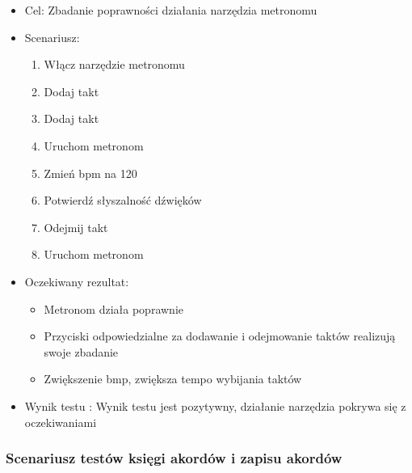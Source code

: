 \begin{itemize}
    \item Cel: Zbadanie poprawności działania narzędzia metronomu
    \item Scenariusz:
        \begin{enumerate}
            \item Włącz narzędzie metronomu
            \item Dodaj takt 
            \item Dodaj takt
            \item Uruchom metronom
            \item Zmień bpm na 120
            \item Potwierdź słyszalność dźwięków
            \item Odejmij takt
            \item Uruchom metronom
        \end{enumerate}
    \item Oczekiwany rezultat:
        \begin{itemize}
            \item Metronom działa poprawnie
            \item Przyciski odpowiedzialne za dodawanie i odejmowanie taktów realizują swoje zbadanie
            \item Zwiększenie bmp, zwiększa tempo wybijania taktów
        \end{itemize}
    \item Wynik testu : Wynik testu jest pozytywny, działanie narzędzia pokrywa się z oczekiwaniami
\end{itemize}

\subsubsection{Scenariusz testów księgi akordów i zapisu akordów}

